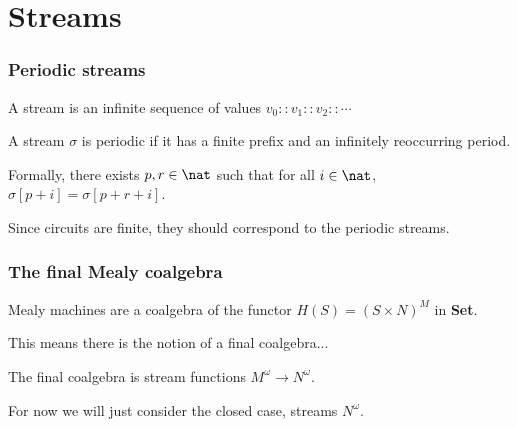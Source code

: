 \section{Streams}

\begin{frame}
    \frametitle{Periodic streams}

    A stream is an \alert{infinite sequence} of values $v_0 :: v_1 :: v_2 :: \cdots$

    \pause

    A stream $\sigma$ is \alert{periodic} if it has a finite \alert{prefix} and an infinitely reoccurring \alert{period}.
    
    \pause

    Formally, there exists $p,r \in \nat$ such that for all $i \in \nat$, $\sigma[p+i] = \sigma[p+r+i]$.
    
    \pause

    Since circuits are \alert{finite}, they should correspond to the \alert{periodic streams}.

\end{frame}

\begin{frame}
    \frametitle{The final Mealy coalgebra}

    Mealy machines are a \alert{coalgebra} of the functor $H(S) = (S \times N)^M$ in \textbf{Set}.

    \pause

    This means there is the notion of a \alert{final coalgebra}...

    \pause

    The final coalgebra is \alert{stream functions} $M^\omega \to N^\omega$.

    \pause

    For now we will just consider the closed case, streams $N^\omega$.

\end{frame}

\begin{frame}
    \frametitle{}
    

\end{frame}